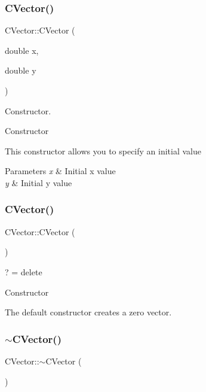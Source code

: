 \subsubsection{\texorpdfstring{CVector()}{CVector()}\hspace{0.1cm}{\footnotesize\ttfamily [1/2]}}
{\footnotesize\ttfamily C\+Vector\+::\+C\+Vector (\begin{DoxyParamCaption}\item[{double}]{x,  }\item[{double}]{y }\end{DoxyParamCaption})}



Constructor. 

Constructor

This constructor allows you to specify an initial value


\begin{DoxyParams}{Parameters}
{\em x} & Initial x value \\
\hline
{\em y} & Initial y value \\
\hline
\end{DoxyParams}
\mbox{\label{class_c_vector_a0f8bc94615cdb6e7c2016ac33c397197}} 
\subsubsection{\texorpdfstring{CVector()}{CVector()}\hspace{0.1cm}{\footnotesize\ttfamily [2/2]}}
{\footnotesize\ttfamily C\+Vector\+::\+C\+Vector (\begin{DoxyParamCaption}{ }\end{DoxyParamCaption})}



? = delete 

Constructor

The default constructor creates a zero vector. \mbox{\label{class_c_vector_a29b5b40a40c27f7fbdd873fc0d5e47fa}} 
\subsubsection{\texorpdfstring{$\sim$CVector()}{~CVector()}}
{\footnotesize\ttfamily C\+Vector\+::$\sim$\+C\+Vector (\begin{DoxyParamCaption}{ }\end{DoxyParamCaption})}



